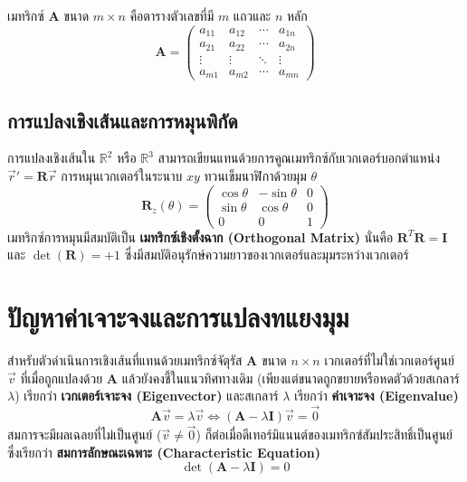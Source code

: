 เมทริกซ์ $\mathbf{A}$ ขนาด $m \times n$ คือตารางตัวเลขที่มี $m$ แถวและ $n$ หลัก
\begin{equation}
\mathbf{A} = \begin{pmatrix}
a_{11} & a_{12} & \cdots & a_{1n} \\
a_{21} & a_{22} & \cdots & a_{2n} \\
\vdots & \vdots & \ddots & \vdots \\
a_{m1} & a_{m2} & \cdots & a_{mn}
\end{pmatrix}
\end{equation}

\subsection{การแปลงเชิงเส้นและการหมุนพิกัด}
การแปลงเชิงเส้นใน $\mathbb{R}^2$ หรือ $\mathbb{R}^3$ สามารถเขียนแทนด้วยการคูณเมทริกซ์กับเวกเตอร์บอกตำแหน่ง $\vec{r}' = \mathbf{R} \vec{r}$
การหมุนเวกเตอร์ในระนาบ $xy$ ทวนเข็มนาฬิกาด้วยมุม $\theta$
\begin{equation}
\mathbf{R}_z(\theta) = \begin{pmatrix}
\cos\theta & -\sin\theta & 0 \\
\sin\theta & \cos\theta & 0 \\
0 & 0 & 1
\end{pmatrix}
\end{equation}
เมทริกซ์การหมุนมีสมบัติเป็น \textbf{เมทริกซ์เชิงตั้งฉาก (Orthogonal Matrix)} นั่นคือ $\mathbf{R}^T \mathbf{R} = \mathbf{I}$ และ $\det(\mathbf{R}) = +1$ ซึ่งมีสมบัติอนุรักษ์ความยาวของเวกเตอร์และมุมระหว่างเวกเตอร์

\section{ปัญหาค่าเจาะจงและการแปลงทแยงมุม}
สำหรับตัวดำเนินการเชิงเส้นที่แทนด้วยเมทริกซ์จัตุรัส $\mathbf{A}$ ขนาด $n \times n$ เวกเตอร์ที่ไม่ใช่เวกเตอร์ศูนย์ $\vec{v}$ ที่เมื่อถูกแปลงด้วย $\mathbf{A}$ แล้วยังคงชี้ในแนวทิศทางเดิม (เพียงแต่ขนาดถูกขยายหรือหดตัวด้วยสเกลาร์ $\lambda$) เรียกว่า \textbf{เวกเตอร์เจาะจง (Eigenvector)} และสเกลาร์ $\lambda$ เรียกว่า \textbf{ค่าเจาะจง (Eigenvalue)}
\begin{equation}
\mathbf{A}\vec{v} = \lambda \vec{v} \iff (\mathbf{A} - \lambda \mathbf{I})\vec{v} = \vec{0}
\end{equation}
สมการจะมีผลเฉลยที่ไม่เป็นศูนย์ ($\vec{v} \neq \vec{0}$) ก็ต่อเมื่อดีเทอร์มิแนนต์ของเมทริกซ์สัมประสิทธิ์เป็นศูนย์ ซึ่งเรียกว่า \textbf{สมการลักษณะเฉพาะ (Characteristic Equation)}
\begin{equation}
\det(\mathbf{A} - \lambda \mathbf{I}) = 0
\end{equation}

